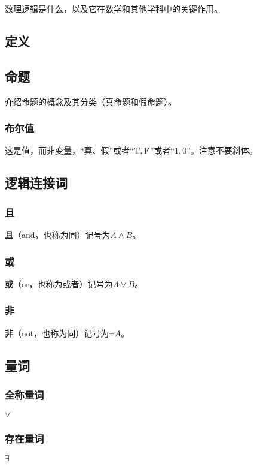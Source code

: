 
\begin{issues}
\issueDraft
\end{issues}
数理逻辑是什么，以及它在数学和其他学科中的关键作用。

\subsection{定义}

\subsection{命题}
介绍命题的概念及其分类（真命题和假命题）。
\subsubsection{布尔值}
这是值，而非变量，“真、假”或者“${\rm T,F}$”或者“$1,0$”。注意不要斜体。
\subsection{逻辑连接词}
\subsubsection{且}
\textbf{且}（and，也称为同）记号为$A\land B$。
\subsubsection{或}
\textbf{或}（or，也称为或者）记号为$A\lor B$。


\subsubsection{非}
\textbf{非}（not，也称为同）记号为$\lnot A$。
\subsection{量词}
\subsubsection{全称量词}
$\forall$
\subsubsection{存在量词}
$\exists$

